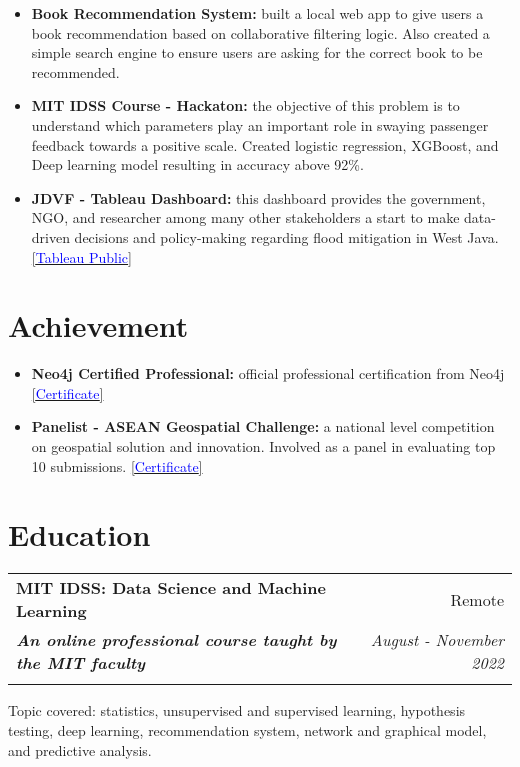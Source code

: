 \documentclass[a4paper, 11pt]{article}
\makeatletter
\newcommand{\resumeItem}[2]{
    \item\small{
        \textbf{#1}{#2 \vspace{-2pt}}
    }
}
\newcommand{\resumeSubheading}[4]{
    \vspace{-1pt}
    \begin{tabular*}{\textwidth}{l@{\extracolsep{\fill}}r}
        \color{lightblue}\textbf{#1} & #2 \\
        \textbf{\textit{\small#3}} & \textit{\small #4} \\
        \textnormal{}\vspace{-5pt}
    \end{tabular*}\vspace{-5pt}
}
\newcommand{\resumeItemListStart}{\begin{itemize}[leftmargin=*]\setlength\itemsep{0em}\vspace{-1pt}}
\newcommand{\resumeItemListEnd}{\end{itemize}\vspace{-5pt}}
\makeatother
\begin{document}
    \resumeItemListStart
    \resumeItem{Book Recommendation System:}{ built a local web app to give users a book
    recommendation based on collaborative filtering logic. Also created a simple search
    engine to ensure users are asking for the correct book to be recommended.
    \href{https://github.com/amrirasyidi/book_recommendation}\faGithub}
    \resumeItem{MIT IDSS Course - Hackaton:}{ the objective of this problem is to
    understand which parameters play an important role in swaying passenger feedback
    towards a positive scale. Created logistic regression, XGBoost, and Deep learning
    model resulting in accuracy above 92\%. 
    \href{https://github.com/amrirasyidi/mit_idss_hackaton}\faGithub}
    \resumeItem{JDVF - Tableau Dashboard:}{ this dashboard provides the government, NGO,
    and researcher among many other stakeholders a start to make data-driven decisions
    and policy-making regarding flood mitigation in West Java. 
    \href{https://public.tableau.com/app/profile/faisal.putra/viz/Book1_16671939458310/DashboardFINAL}{[\textcolor{blue}{Tableau Public}]}}
    \resumeItemListEnd

    \vspace{-20pt}
    \section{Achievement}

    \resumeItemListStart
    \resumeItem{Neo4j Certified Professional:}{ official professional certification from 
    Neo4j
    \href{https://graphacademy.neo4j.com/c/4cb304b6-5a5b-4f45-96cf-1840a2982e55/}{[\textcolor{blue}{Certificate}]}}
    \resumeItem{Panelist - ASEAN Geospatial Challenge:}{ a national level competition on 
    geospatial solution and innovation. Involved as a panel in evaluating top 10 submissions.
    \href{https://drive.google.com/file/d/1NkMhFTBGqnOs2HpcvlLVMFIajq2MSO9k/view?usp=sharing}{[\textcolor{blue}{Certificate}]}}
    \resumeItemListEnd
    
    \vspace{-5pt}
    \section{Education}

    \resumeSubheading
    {MIT IDSS: Data Science and Machine Learning}
    {Remote}
    {An online professional course taught by the MIT faculty}
    {August - November 2022}
    {Topic covered: statistics, unsupervised and supervised learning, hypothesis testing, 
    deep learning, recommendation system, network and graphical model, and predictive 
    analysis.}
    
\end{document}
